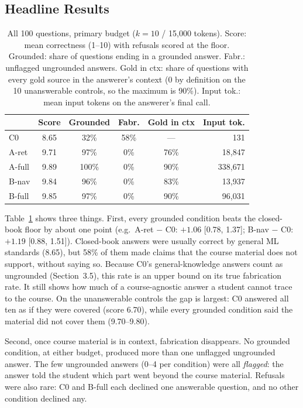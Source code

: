 \documentclass[letterpaper]{article} %
\begin{document}
\subsection{Headline Results}

\begin{table}[t]
\centering
\small
\setlength{\tabcolsep}{3pt}
\begin{tabular}{@{}lccccr@{}}
\toprule
 & Score & Grounded & Fabr. & Gold in ctx & Input tok. \\
\midrule
C0 & 8.65 & 32\% & 58\% & --- & 131 \\
A-ret & 9.71 & 97\% & 0\% & 76\% & 18{,}847 \\
A-full & 9.89 & 100\% & 0\% & 90\% & 338{,}671 \\
B-nav & 9.84 & 96\% & 0\% & 83\% & 13{,}937 \\
B-full & 9.85 & 97\% & 0\% & 90\% & 96{,}031 \\
\bottomrule
\end{tabular}
\caption{All 100 questions, primary budget ($k{=}10$ / 15{,}000 tokens). Score: mean correctness (1--10) with refusals scored at the floor. Grounded: share of questions ending in a grounded answer. Fabr.: unflagged ungrounded answers. Gold in ctx: share of questions with every gold source in the answerer's context (0 by definition on the 10 unanswerable controls, so the maximum is 90\%). Input tok.: mean input tokens on the answerer's final call.}
\label{tab:headline}
\end{table}

Table~\ref{tab:headline} shows three things. First, every grounded condition beats the closed-book floor by about one point (e.g.\ A-ret $-$ C0: $+1.06$ [0.78, 1.37]; B-nav $-$ C0: $+1.19$ [0.88, 1.51]). Closed-book answers were usually correct by general ML standards (8.65), but 58\% of them made claims that the course material does not support, without saying so. Because C0's general-knowledge answers count as ungrounded (Section~3.5), this rate is an upper bound on its true fabrication rate. It still shows how much of a course-agnostic answer a student cannot trace to the course. On the unanswerable controls the gap is largest: C0 answered all ten as if they were covered (score 6.70), while every grounded condition said the material did not cover them (9.70--9.80).

Second, once course material is in context, fabrication disappears. No grounded condition, at either budget, produced more than one unflagged ungrounded answer. The few ungrounded answers (0--4 per condition) were all \emph{flagged}: the answer told the student which part went beyond the course material. Refusals were also rare: C0 and B-full each declined one answerable question, and no other condition declined any.
\end{document}
